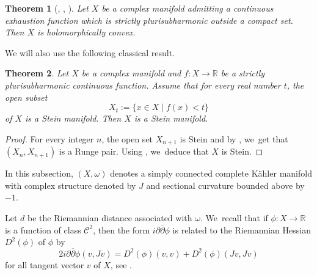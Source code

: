 \documentclass[JEP,XML,SOM,Unicode,NoEqCountersInSection,published]{cedram}
\newtheorem*{theorem*}{Theorem}
\theoremstyle{definition}
\newcommand{\R}{\mathbb{R}}
\begin{document}
\begin{theorem*}[{\cite{grauertLeviProblemImbedding1958}, \cite[Cor.\,2.4]{peternellPseudoconvexityLeviProblem1994}}, \cite{narasimhanLeviProblemComplex1962}]
Let $X$ be a complex manifold admitting a continuous exhaustion function which is strictly plurisubharmonic outside a compact set. Then $X$ is holomorphically convex.
\end{theorem*}

We will also use the following classical result.

\begin{theorem*}\label{thm-docquier-grauert}
Let $X$ be a complex manifold and $f:X\to \R$ be a strictly plurisubharmonic continuous function. Assume that for every real number $t$, the open subset
\begin{equation*}
X_t:= \{x\in X\mid f(x)<t\}
\end{equation*}
of $X$ is a Stein manifold. Then $X$ is a Stein manifold.
\end{theorem*}

\begin{proof}
For every integer $n$, the open set $X_{n+1}$ is Stein and by \cite[Cor.\,1]{narasimhanLeviProblemComplex1962}, we~get that $(X_{n},X_{n+1})$ is a Runge pair. Using \cite[Satz 1.3]{steinUberlagerungenHolomorphvollstandigerKomplexer1956}, we~deduce that $X$ is Stein.
\end{proof}


In this subsection, $(X,\omega)$ denotes a simply connected complete Kähler manifold with complex structure denoted by $J$ and sectional curvature bounded above by $-1$.

Let $d$ be the Riemannian distance associated with $\omega$. We~recall that if $\phi:X\to \R$ is a function of class $\mathcal{C}^2$, then the form $i\partial\overline{\partial}\phi$ is related to the Riemannian Hessian $D^{2}(\phi)$ of $\phi$ by \begin{equation}\label{eq-lev-hessienne}
2i\partial\overline{\partial}\phi(v,Jv)=D^{2}(\phi)(v,v)+D^{2}(\phi)(Jv,Jv)
\end{equation}
for all tangent vector $v$ of $X$, see \cite{greeneSubharmonicityPlurisubharmonicityGeodesically1973}.
\end{document}
